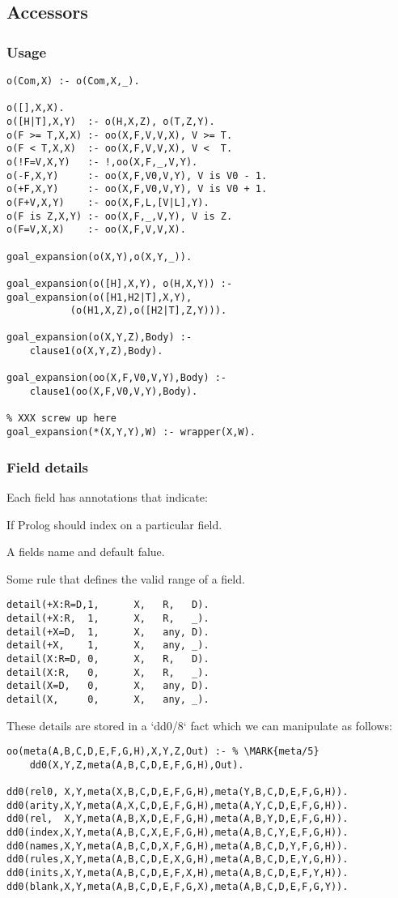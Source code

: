 \documentclass[twocolumn,global]{svjour}
\begin{document}
\subsection{ Accessors
}
\subsubsection{ Usage }\begin{Verbatim}
o(Com,X) :- o(Com,X,_).

o([],X,X).
o([H|T],X,Y)  :- o(H,X,Z), o(T,Z,Y).
o(F >= T,X,X) :- oo(X,F,V,V,X), V >= T.
o(F < T,X,X)  :- oo(X,F,V,V,X), V <  T.
o(!F=V,X,Y)   :- !,oo(X,F,_,V,Y).
o(-F,X,Y)     :- oo(X,F,V0,V,Y), V is V0 - 1.
o(+F,X,Y)     :- oo(X,F,V0,V,Y), V is V0 + 1.
o(F+V,X,Y)    :- oo(X,F,L,[V|L],Y).
o(F is Z,X,Y) :- oo(X,F,_,V,Y), V is Z.
o(F=V,X,X)    :- oo(X,F,V,V,X).

goal_expansion(o(X,Y),o(X,Y,_)).

goal_expansion(o([H],X,Y), o(H,X,Y)) :-
goal_expansion(o([H1,H2|T],X,Y),
           (o(H1,X,Z),o([H2|T],Z,Y))).

goal_expansion(o(X,Y,Z),Body) :-
    clause1(o(X,Y,Z),Body).

goal_expansion(oo(X,F,V0,V,Y),Body) :-
    clause1(oo(X,F,V0,V,Y),Body).

% XXX screw up here
goal_expansion(*(X,Y,Y),W) :- wrapper(X,W).
\end{Verbatim}
\subsubsection{ Field details
}
 Each field has annotations that indicate:
\be
\item If Prolog should index on a particular field.
\item A fields name and default falue.
\item Some rule that defines the
valid range of a field.
\ee  \begin{Verbatim}
detail(+X:R=D,1,      X,   R,   D).
detail(+X:R,  1,      X,   R,   _).
detail(+X=D,  1,      X,   any, D).
detail(+X,    1,      X,   any, _).
detail(X:R=D, 0,      X,   R,   D).
detail(X:R,   0,      X,   R,   _).
detail(X=D,   0,      X,   any, D).
detail(X,     0,      X,   any, _).
\end{Verbatim}
These details are stored in a `dd0/8` fact which we
can manipulate as follows:   \begin{Verbatim}
oo(meta(A,B,C,D,E,F,G,H),X,Y,Z,Out) :- % \MARK{meta/5}
    dd0(X,Y,Z,meta(A,B,C,D,E,F,G,H),Out).

dd0(rel0, X,Y,meta(X,B,C,D,E,F,G,H),meta(Y,B,C,D,E,F,G,H)).
dd0(arity,X,Y,meta(A,X,C,D,E,F,G,H),meta(A,Y,C,D,E,F,G,H)).
dd0(rel,  X,Y,meta(A,B,X,D,E,F,G,H),meta(A,B,Y,D,E,F,G,H)).
dd0(index,X,Y,meta(A,B,C,X,E,F,G,H),meta(A,B,C,Y,E,F,G,H)).
dd0(names,X,Y,meta(A,B,C,D,X,F,G,H),meta(A,B,C,D,Y,F,G,H)).
dd0(rules,X,Y,meta(A,B,C,D,E,X,G,H),meta(A,B,C,D,E,Y,G,H)).
dd0(inits,X,Y,meta(A,B,C,D,E,F,X,H),meta(A,B,C,D,E,F,Y,H)).
dd0(blank,X,Y,meta(A,B,C,D,E,F,G,X),meta(A,B,C,D,E,F,G,Y)).
\end{Verbatim}
\end{document}
